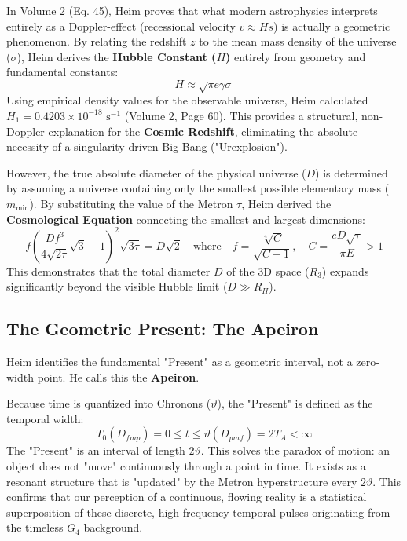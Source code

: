 \documentclass[11pt,a4paper,oneside]{article}
\begin{document}
In Volume 2 (Eq. 45), Heim proves that what modern astrophysics interprets entirely as a Doppler-effect (recessional velocity $v \approx H s$) is actually a geometric phenomenon. By relating the redshift $z$ to the mean mass density of the universe ($\sigma$), Heim derives the \textbf{Hubble Constant ($H$)} entirely from geometry and fundamental constants:
\begin{equation}
    H \approx \sqrt{\pi e \gamma \sigma}
\end{equation}
Using empirical density values for the observable universe, Heim calculated $H_1 = 0.4203 \times 10^{-18} \text{ s}^{-1}$ (Volume 2, Page 60). This provides a structural, non-Doppler explanation for the \textbf{Cosmic Redshift}, eliminating the absolute necessity of a singularity-driven Big Bang ("Urexplosion").

However, the true absolute diameter of the physical universe ($D$) is determined by assuming a universe containing only the smallest possible elementary mass ($m_{\min}$). By substituting the value of the Metron $\tau$, Heim derived the \textbf{Cosmological Equation} connecting the smallest and largest dimensions:
\begin{equation}
    f \left(\frac{D f^3}{4\sqrt{2\tau}}\sqrt{3}-1 \right)^2\sqrt{3\tau} = D\sqrt{2} \quad \text{where} \quad f = \frac{\sqrt[4]{C}}{\sqrt{C-1}}, \quad C = \frac{eD\sqrt{\tau}}{\pi E} > 1
\end{equation}
This demonstrates that the total diameter $D$ of the 3D space ($R_3$) expands significantly beyond the visible Hubble limit ($D \gg R_H$).

\subsection{The Geometric Present: The Apeiron}
Heim identifies the fundamental "Present" as a geometric interval, not a zero-width point. He calls this the \textbf{Apeiron}. 

Because time is quantized into Chronons ($\vartheta$), the "Present" is defined as the temporal width:
\begin{equation}
    T_0(D_{fmp}) = 0 \le t \le \vartheta(D_{pmf}) = 2 T_A < \infty
\end{equation}
The "Present" is an interval of length $2\vartheta$. This solves the paradox of motion: an object does not "move" continuously through a point in time. It exists as a resonant structure that is "updated" by the Metron hyperstructure every $2\vartheta$. This confirms that our perception of a continuous, flowing reality is a statistical superposition of these discrete, high-frequency temporal pulses originating from the timeless $G_4$ background.
\end{document}
